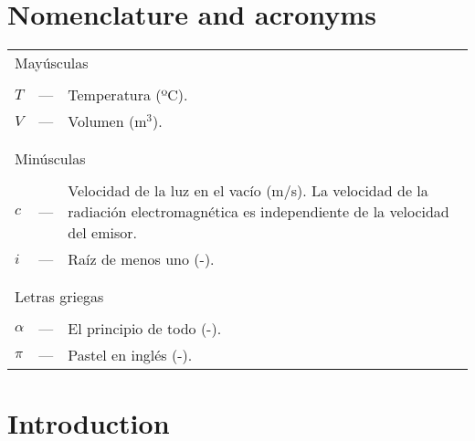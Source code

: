 \documentclass[12pt,a4paper]{book}
\begin{document}
\chapter*{Nomenclature and acronyms} \label{chap:NomenclatureAcronyms}  %
\begin{longtable}{p{5mm} c p{120mm} }
\multicolumn{3}{l}{Mayúsculas}\\
\\
$T$ & --- & Temperatura (ºC).\\
$V$ & --- & Volumen (m$^3$).\\
\\
\\
\multicolumn{3}{l}{Minúsculas}\\
\\
$c$ & --- & Velocidad de la luz en el vacío (m/s). La velocidad de la radiación electromagnética es independiente de la velocidad del emisor.\\
$i$ & --- & Raíz de menos uno (-).\\
\\
\\
\multicolumn{3}{l}{Letras griegas}\\
\\
$\alpha$ & --- & El principio de todo (-).\\
$\pi$ & --- & Pastel en inglés (-).\\
\end{longtable}

\let\OLDthebibliography=\thebibliography
\def\thebibliography#1{\OLDthebibliography{#1}%
\addcontentsline{toc}{chapter}{\bibname}}

\tableofcontents

\cleardoublepage
{} %
\listoffigures

\cleardoublepage
{} %
\listoftables




\chapter{Introduction}  \label{chap:GeneralIntroduction} %
\end{document}

